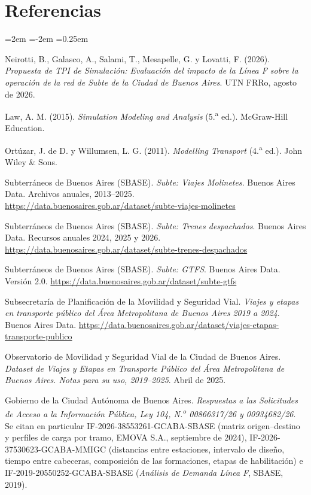 \documentclass{article}
\begin{document}
\section*{Referencias}
\begin{list}{}{\leftmargin=2em \itemindent=-2em \itemsep=0.25em}

\item[] [1] Neirotti, B., Galasco, A., Salami, T., Mesapelle, G. y Lovatti, F. (2026).
  \textit{Propuesta de TPI de Simulación: Evaluación del impacto de la Línea F sobre la operación de la red
  de Subte de la Ciudad de Buenos Aires}. UTN FRRo, agosto de 2026.

\item[] [2] Law, A. M. (2015). \textit{Simulation Modeling and Analysis} (5.\textsuperscript{a} ed.).
  McGraw-Hill Education.

\item[] [3] Ortúzar, J. de D. y Willumsen, L. G. (2011). \textit{Modelling Transport} (4.\textsuperscript{a}
  ed.). John Wiley \& Sons.

\item[] [4] Subterráneos de Buenos Aires (SBASE). \textit{Subte: Viajes Molinetes}. Buenos Aires Data.
  Archivos anuales, 2013--2025. \url{https://data.buenosaires.gob.ar/dataset/subte-viajes-molinetes}

\item[] [5] Subterráneos de Buenos Aires (SBASE). \textit{Subte: Trenes despachados}. Buenos Aires Data.
  Recursos anuales 2024, 2025 y 2026. \url{https://data.buenosaires.gob.ar/dataset/subte-trenes-despachados}

\item[] [6] Subterráneos de Buenos Aires (SBASE). \textit{Subte: GTFS}. Buenos Aires Data. Versión 2.0.
  \url{https://data.buenosaires.gob.ar/dataset/subte-gtfs}

\item[] [7] Subsecretaría de Planificación de la Movilidad y Seguridad Vial. \textit{Viajes y etapas en
  transporte público del Área Metropolitana de Buenos Aires 2019 a 2024}. Buenos Aires Data.
  \url{https://data.buenosaires.gob.ar/dataset/viajes-etapas-transporte-publico}

\item[] [8] Observatorio de Movilidad y Seguridad Vial de la Ciudad de Buenos Aires. \textit{Dataset de
  Viajes y Etapas en Transporte Público del Área Metropolitana de Buenos Aires. Notas para su uso,
  2019--2025}. Abril de 2025.

\item[] [9] Gobierno de la Ciudad Autónoma de Buenos Aires. \textit{Respuestas a las Solicitudes de Acceso a
  la Información Pública, Ley 104, N.\textsuperscript{o} 00866317/26 y 00934682/26}. Se citan en particular
  IF-2026-38553261-GCABA-SBASE (matriz origen--destino y perfiles de carga por tramo, EMOVA S.A., septiembre de
  2024), IF-2026-37530623-GCABA-MMIGC (distancias entre estaciones, intervalo de diseño, tiempo entre
  cabeceras, composición de las formaciones, etapas de habilitación) e IF-2019-20550252-GCABA-SBASE
  (\textit{Análisis de Demanda Línea F}, SBASE, 2019).


\end{list}
\end{document}
